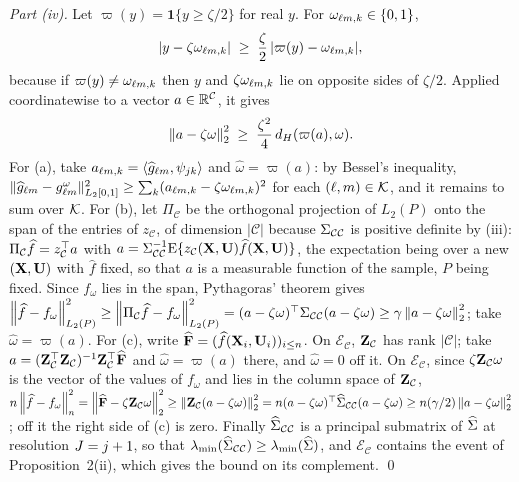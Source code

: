 \emph{Part (iv).} Let $\varpi(y) = \mathbf{1}\{y \ge \zeta/2\}$ for real $y$.
For $\omega_{\ell m,k} \in \{0,1\}$,
\begin{equation}
  \label{eq:hypercube-threshold}
  |y - \zeta\omega_{\ell m,k}| \;\ge\; \frac{\zeta}{2}\,
  |\varpi(y) - \omega_{\ell m,k}| ,
\end{equation}
because if $\varpi(y) \ne \omega_{\ell m,k}$ then $y$ and
$\zeta\omega_{\ell m,k}$ lie on opposite sides of $\zeta/2$. Applied
coordinatewise to a vector $a \in \mathbb{R}^{\mathcal{C}}$, it gives
\[
  \left\lVert a-\zeta\omega \right\rVert_{2}^{2} \;\ge\; \frac{\zeta^{2}}{4}\,d_{H}(\varpi(a),\omega) .
\]
For
(a), take $a_{\ell m,k} = \langle \widehat{g}_{\ell m}, \psi_{jk} \rangle$
and $\widehat\omega = \varpi(a)$: by Bessel's inequality,
$\lVert\widehat{g}_{\ell m}-g_{\ell m}^{\omega}\rVert_{L_2[0,1]}^{2} \ge
\sum_{k}(a_{\ell m,k}-\zeta\omega_{\ell m,k})^{2}$ for each
$(\ell,m) \in \mathcal{K}$, and it remains to sum over $\mathcal{K}$. For (b), let
$\Pi_{\mathcal{C}}$ be the orthogonal projection of $L_2(P)$ onto the span of
the entries of $z_{\mathcal{C}}$, of dimension $|\mathcal{C}|$ because
$\Sigma_{\mathcal{C}\mathcal{C}}$ is positive definite by (iii):
$\Pi_{\mathcal{C}}\widehat{f} = z_{\mathcal{C}}^{\top} a$ with
$a = \Sigma_{\mathcal{C}\mathcal{C}}^{-1}\mathrm{E}\{z_{\mathcal{C}}(\mathbf{X},\mathbf{U})\widehat{f}(\mathbf{X},\mathbf{U})\}$,
the expectation being over a new $(\mathbf{X},\mathbf{U})$ with $\widehat{f}$ fixed, so that
$a$ is a measurable function of the sample, $P$ being fixed. Since $f_{\omega}$
lies in the span, Pythagoras' theorem gives
$\left\lVert \widehat{f}-f_{\omega} \right\rVert_{L_2(P)}^{2} \ge
\left\lVert \Pi_{\mathcal{C}}\widehat{f}-f_{\omega} \right\rVert_{L_2(P)}^{2} =
(a-\zeta\omega)^{\top}\Sigma_{\mathcal{C}\mathcal{C}}(a-\zeta\omega) \ge
\gamma\left\lVert a-\zeta\omega \right\rVert_{2}^{2}$; take $\widehat\omega = \varpi(a)$. For
(c), write $\widehat{\mathbf{F}} = (\widehat{f}(\mathbf{X}_i,\mathbf{U}_i))_{i\le n}$. On
$\mathcal{E}_{\mathcal{C}}$, $\mathbf{Z}_{\mathcal{C}}$ has rank $|\mathcal{C}|$; take
$a = (\mathbf{Z}_{\mathcal{C}}^{\top}\mathbf{Z}_{\mathcal{C}})^{-1}\mathbf{Z}_{\mathcal{C}}^{\top}\widehat{\mathbf{F}}$
and $\widehat\omega = \varpi(a)$ there, and $\widehat\omega = 0$ off it. On
$\mathcal{E}_{\mathcal{C}}$, since $\zeta\mathbf{Z}_{\mathcal{C}}\omega$ is the vector
of the values of $f_{\omega}$ and lies in the column space of
$\mathbf{Z}_{\mathcal{C}}$,
$n\left\lVert \widehat{f}-f_{\omega} \right\rVert_{n}^{2} =
\left\lVert \widehat{\mathbf{F}}-\zeta\mathbf{Z}_{\mathcal{C}}\omega \right\rVert_{2}^{2} \ge
\left\lVert \mathbf{Z}_{\mathcal{C}}(a-\zeta\omega) \right\rVert_{2}^{2} =
n(a-\zeta\omega)^{\top}\widehat{\Sigma}_{\mathcal{C}\mathcal{C}}(a-\zeta\omega) \ge
n(\gamma/2)\left\lVert a-\zeta\omega \right\rVert_{2}^{2}$; off it the right side of (c) is
zero. Finally $\widehat{\Sigma}_{\mathcal{C}\mathcal{C}}$ is a principal submatrix of
$\widehat{\Sigma}$ at resolution $J = j+1$, so that
$\lambda_{\min}(\widehat{\Sigma}_{\mathcal{C}\mathcal{C}}) \ge \lambda_{\min}(\widehat{\Sigma})$, and
$\mathcal{E}_{\mathcal{C}}$ contains the event of Proposition~2(ii), which
gives the bound on its complement. \qed

